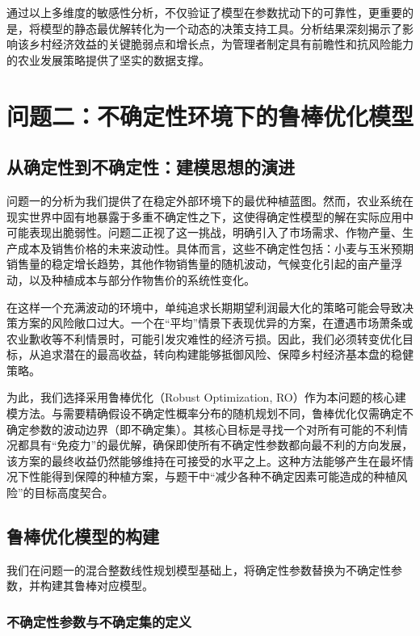 \documentclass[withoutpreface,bwprint]{cumcmthesis} %
\begin{document}
通过以上多维度的敏感性分析，不仅验证了模型在参数扰动下的可靠性，更重要的是，将模型的静态最优解转化为一个动态的决策支持工具。分析结果深刻揭示了影响该乡村经济效益的关键脆弱点和增长点，为管理者制定具有前瞻性和抗风险能力的农业发展策略提供了坚实的数据支撑。


\section{问题二：不确定性环境下的鲁棒优化模型}

\subsection{从确定性到不确定性：建模思想的演进}

问题一的分析为我们提供了在稳定外部环境下的最优种植蓝图。然而，农业系统在现实世界中固有地暴露于多重不确定性之下，这使得确定性模型的解在实际应用中可能表现出脆弱性。问题二正视了这一挑战，明确引入了市场需求、作物产量、生产成本及销售价格的未来波动性。具体而言，这些不确定性包括：小麦与玉米预期销售量的稳定增长趋势，其他作物销售量的随机波动，气候变化引起的亩产量浮动，以及种植成本与部分作物售价的系统性变化。

在这样一个充满波动的环境中，单纯追求长期期望利润最大化的策略可能会导致决策方案的风险敞口过大。一个在“平均”情景下表现优异的方案，在遭遇市场萧条或农业歉收等不利情景时，可能引发灾难性的经济亏损。因此，我们必须转变优化目标，从追求潜在的最高收益，转向构建能够抵御风险、保障乡村经济基本盘的稳健策略。

为此，我们选择采用鲁棒优化（Robust Optimization,
RO）作为本问题的核心建模方法。与需要精确假设不确定性概率分布的随机规划不同，鲁棒优化仅需确定不确定参数的波动边界（即不确定集）。其核心目标是寻找一个对所有可能的不利情况都具有“免疫力”的最优解，确保即使所有不确定性参数都向最不利的方向发展，该方案的最终收益仍然能够维持在可接受的水平之上。这种方法能够产生在最坏情况下性能得到保障的种植方案，与题干中“减少各种不确定因素可能造成的种植风险”的目标高度契合。

\subsection{鲁棒优化模型的构建}

我们在问题一的混合整数线性规划模型基础上，将确定性参数替换为不确定性参数，并构建其鲁棒对应模型。

\subsubsection{不确定性参数与不确定集的定义}
\end{document}
